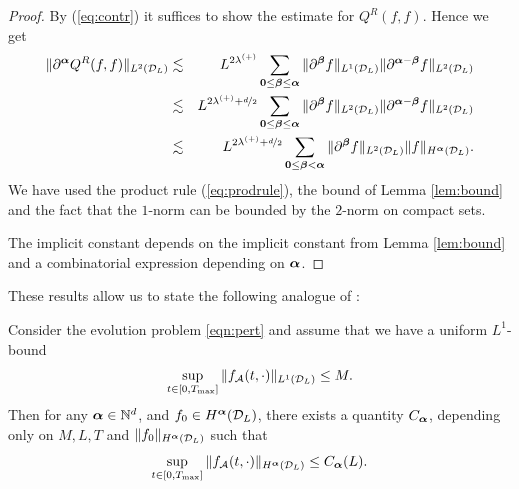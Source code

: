 \begin{proof}
    By (\ref{eq:contr}) it suffices to show the estimate for $Q^R(f,f)$. 
    Hence we get
    \begin{eqnarray*}
        \|\partial^{\bm\alpha} Q^R(f,f)\|_{L^2(\mathcal{D}_L)}
        & \lesssim &
        L^{2\lambda^{(+)}}\sum_{{\bm0} \le {\bm\beta} \le {\bm\alpha}}
        \|\partial^{\bm\beta} f \|_{L^1(\mathcal{D}_L)} 
        \|\partial^{{\bm\alpha} - {\bm\beta}}f\|_{L^2(\mathcal{D}_L)} \\
        & \lesssim &
        L^{2\lambda^{(+)}+\nicefrac{d}{2}}\sum_{{\bm0} \le {\bm\beta} \le {\bm\alpha}}
        \|\partial^{\bm\beta} f \|_{L^2(\mathcal{D}_L)}
        \|\partial^{{\bm\alpha} - {\bm\beta}}f\|_{L^2(\mathcal{D}_L)}
        \\
        &\lesssim &
        L^{2\lambda^{(+)}+\nicefrac{d}{2}} \sum_{{\bm0} \le {\bm\beta} <{\bm\alpha}}
        \|\partial^{\bm\beta} f \|_{L^2(\mathcal{D}_L)} 
        \|f\|_{H^{\bm\alpha}(\mathcal{D}_L)}.
    \end{eqnarray*}
    We have used the product rule (\ref{eq:prodrule}), the bound of Lemma
    \ref{lem:bound} and the fact that the $1$-norm can be bounded by the
    $2$-norm on compact sets.

    The implicit constant depends on the implicit constant from Lemma
    \ref{lem:bound} and a combinatorial expression depending on ${\bm\alpha}$.
\end{proof}
These results allow us to state the following analogue of \cite[Lemma
4.2]{Filbet11}:
\begin{lemma}\label{lem:prop}
    Consider the evolution problem \eqref{eqn:pert} and
    assume that we have a uniform $L^1$-bound 
    \begin{equation}
        \sup_{t\in [0,T_\mathrm{max}]}\|f_{\mathcal{A}}(t,\cdot)\|_{L^1(\mathcal{D}_L)}\le M.
    \end{equation}
    Then for any ${\bm\alpha} \in \mathbb{N}^d$, and $f_0\in H^{\bm\alpha}(\mathcal{D}_L)$, there exists
    a quantity $C_{\bm\alpha}$, depending only on $M,L,T$ and
    $\|f_0\|_{H^{{\bm\alpha}}(\mathcal{D}_L)}$ such that
    \begin{equation}\label{eq:smoothprop}
        \sup_{t\in [0,T_\mathrm{max}]}\|f_{\mathcal{A}}(t,\cdot)\|_{H^{\bm\alpha}(\mathcal{D}_L)}
        \le C_{\bm\alpha}(L).
    \end{equation}
\end{lemma}
